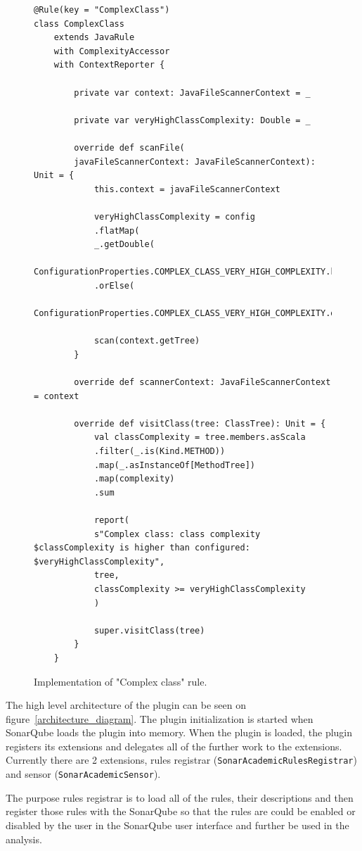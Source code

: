 \begin{figure} [htb]
    \lstset{language=Scala}
    \begin{lstlisting}
@Rule(key = "ComplexClass")
class ComplexClass
    extends JavaRule
    with ComplexityAccessor
    with ContextReporter {

        private var context: JavaFileScannerContext = _

        private var veryHighClassComplexity: Double = _

        override def scanFile(
        javaFileScannerContext: JavaFileScannerContext): Unit = {
            this.context = javaFileScannerContext

            veryHighClassComplexity = config
            .flatMap(
            _.getDouble(
            ConfigurationProperties.COMPLEX_CLASS_VERY_HIGH_COMPLEXITY.key))
            .orElse(
            ConfigurationProperties.COMPLEX_CLASS_VERY_HIGH_COMPLEXITY.defaultValue.toDouble)

            scan(context.getTree)
        }

        override def scannerContext: JavaFileScannerContext = context

        override def visitClass(tree: ClassTree): Unit = {
            val classComplexity = tree.members.asScala
            .filter(_.is(Kind.METHOD))
            .map(_.asInstanceOf[MethodTree])
            .map(complexity)
            .sum

            report(
            s"Complex class: class complexity $classComplexity is higher than configured: $veryHighClassComplexity",
            tree,
            classComplexity >= veryHighClassComplexity
            )

            super.visitClass(tree)
        }
    }
    \end{lstlisting}
    \caption{Implementation of "Complex class" rule.}
    \label{complex_class_implementation}
\end{figure}

\FloatBarrier

The high level architecture of the plugin can be seen on figure~\ref{architecture_diagram}.
The plugin initialization is started when SonarQube loads the plugin into memory.
When the plugin is loaded, the plugin registers its extensions and delegates all of the
further work to the extensions.
Currently there are 2 extensions, rules registrar (\verb|SonarAcademicRulesRegistrar|) and
sensor (\verb|SonarAcademicSensor|).


The purpose rules registrar is to load all of the rules, their descriptions and then register
those rules with the SonarQube so that the rules are could be enabled or disabled by the
user in the SonarQube user interface and further be used in the analysis.


